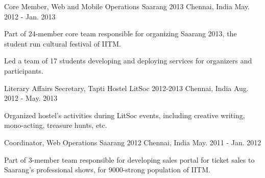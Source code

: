\begin{cventries}
	\cventry
	{Core Member, Web and Mobile Operations}
	{Saarang 2013}
	{Chennai, India}
	{May. 2012 - Jan. 2013}
	{
		\begin{cvitems}
			\item{Part of 24-member core team responsible for organizing Saarang 2013, the student run cultural festival of IITM.}
			\item{Led a team of 17 students developing and deploying services for organizers and participants.}
		\end{cvitems}
	}

	\cventry
	{Literary Affairs Secretary, Tapti Hostel}
	{LitSoc 2012-2013}
	{Chennai, India}
	{Aug. 2012 - May. 2013}
	{
		\begin{cvitems}
			\item{Organized hostel's activities during LitSoc events, including creative writing, mono-acting, treasure hunts, etc.}
		\end{cvitems}
	}

	\cventry
	{Coordinator, Web Operations}
	{Saarang 2012}
	{Chennai, India}
	{May. 2011 - Jan. 2012}
	{
		\begin{cvitems}
			\item{Part of 3-member team responsible for developing sales portal for ticket sales to Saarang's professional shows, for 9000-strong population of IITM.}
		\end{cvitems}
	}

\end{cventries}
